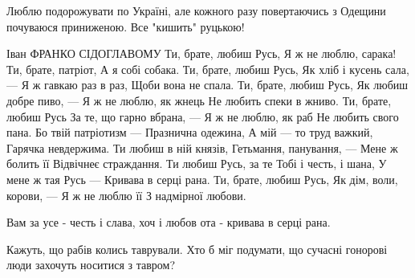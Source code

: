 \begin{itemize}
 
Люблю подорожувати по Україні, але кожного разу повертаючись з Одещини почуваюся приниженою. Все "кишить" руцькою!

 
\begin{multicols}{2}
\obeycr
Іван ФРАНКО
СІДОГЛАВОМУ
\smallskip
Ти, брате, любиш Русь,
Я ж не люблю, сарака!
Ти, брате, патріот,
А я собі собака.
\smallskip
Ти, брате, любиш Русь,
Як хліб і кусень сала, —
Я ж гавкаю раз в раз,
Щоби вона не спала.
\smallskip
Ти, брате, любиш Русь,
Як любиш добре пиво, —
Я ж не люблю, як жнець
Не любить спеки в жниво.
\smallskip
Ти, брате, любиш Русь
За те, що гарно вбрана, —
Я ж не люблю, як раб
Не любить свого пана.
\smallskip
Бо твій патріотизм —
Празнична одежина,
А мій — то труд важкий,
Гарячка невдержима.
\smallskip
Ти любиш в ній князів,
Гетьмання, панування, —
Мене ж болить її
Відвічнеє страждання.
\smallskip
Ти любиш Русь, за те
Тобі і честь, і шана,
У мене ж тая Русь —
Кривава в серці рана.
\smallskip
Ти, брате, любиш Русь,
Як дім, воли, корови, —
Я ж не люблю її
З надмірної любови.
\restorecr
\end{multicols}

\begin{itemize}
 
Вам за усе - честь і слава, хоч і любов ота - кривава в серці рана.
\end{itemize}

 

Кажуть, що рабів колись таврували. Хто б міг подумати, що сучасні гонорові люди захочуть носитися з тавром?


\end{itemize}
